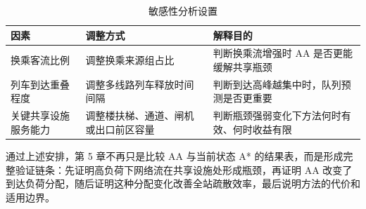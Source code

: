 \documentclass[UTF8,a4paper,12pt]{ctexart}
\begin{document}
\begin{table}[htbp]
\centering
\caption{敏感性分析设置}
\small
\begin{tabular}{p{}p{}p{}}
\toprule
因素 & 调整方式 & 解释目的 \\
\midrule
换乘客流比例 & 调整换乘来源组占比 & 判断换乘流增强时 AA 是否更能缓解共享瓶颈 \\
列车到达重叠程度 & 调整多线路列车释放时间间隔 & 判断到达高峰越集中时，队列预测是否更重要 \\
关键共享设施服务能力 & 调整楼扶梯、通道、闸机或出口前区容量 & 判断瓶颈强弱变化下方法何时有效、何时收益有限 \\
\bottomrule
\end{tabular}
\end{table}

通过上述安排，第 5 章不再只是比较 AA 与当前状态 A* 的结果表，而是形成完整验证链条：先证明高负荷下网络流在共享设施处形成瓶颈，再证明 AA 改变了到达负荷分配，随后证明这种分配变化改善全站疏散效率，最后说明方法的代价和适用边界。
\end{document}
